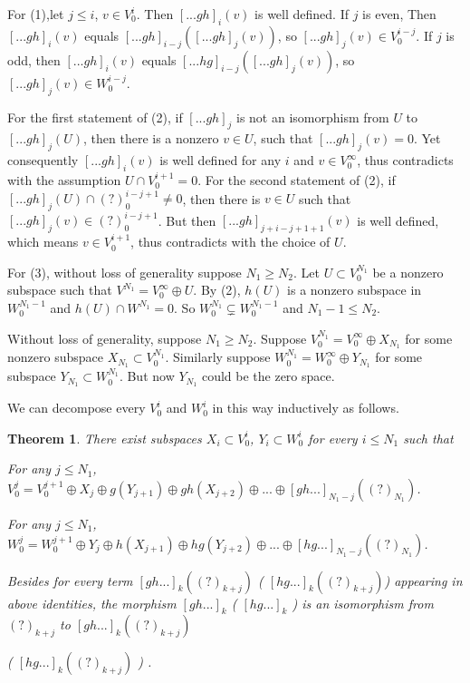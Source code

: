 \def\CTEXPreproc{Created by ctex v0.2.12, don't edit!}\documentclass[11pt]{article}
\newtheorem{thm}{Theorem}[section]
\begin{document}
\begin{pf} For (1),let $j\leq i$, $v\in V^i_0$. Then $[...gh]_i(v)$ is well defined. If $j$ is even, Then $[...gh]_i(v)$ equals
$[...gh]_{i-j}( [...gh]_{j}(v)  )$, so $ [...gh]_{j}(v)\in V^{i-j}_0   $. If $j$ is odd, then $ [...gh]_i(v) $ equals
$ [...hg]_{i-j}( [...gh]_{j}(v)  )  $, so $ [...gh]_{j}(v)\in W^{i-j}_0   $.

For the first statement of  (2), if $[...gh]_j$ is not an isomorphism from $U$ to $ [...gh]_j (U)$, then there is a nonzero $v\in U$, such that $[...gh]_j (v)=0   $. Yet consequently $[...gh]_i (v) $ is well defined for any $i$ and $v\in V^{\infty}_0$, thus contradicts with the assumption $U\cap V^{i+1}_0 =0$.
For the second statement of (2), if  $[...gh]_j (U)\cap (?)^{i-j+1} _0 \neq0  $, then there is $v\in U$ such that $[...gh]_j (v) \in (?)^{i-j+1} _0  $. But then $[...gh]_{j+i-j+1+1}(v)$ is well defined, which means $ v\in V^{i+1}_0  $, thus contradicts with the choice of $U$.

For (3), without loss of generality suppose $N_1 \geq N_2$. Let $U\subset V^{N_1}_0 $ be a nonzero subspace such that
$V^{N_1} = V^{\infty}_0 \oplus U $. By (2), $h(U )$ is a nonzero subspace in $ W^{N_1 -1 }_0 $ and $h(U)\cap W^{N_1 }=0   $. So
$W^{N_1}_0 \subsetneq W^{N_1 -1}_0 $ and $N_1 -1 \leq N_2  $. \\

\end{pf}

Without loss of generality, suppose $N_1 \geq N_2$. Suppose $V^{N_1}_0 = V^{\infty}_0 \oplus X_{N_1 }$ for some nonzero subspace
$X_{N_1}\subset V^{N_1}_0$.
 Similarly suppose $W^{N_1}_0 = W^{\infty}_0 \oplus Y_{N_1}$ for some subspace $Y_{N_1}\subset W^{N_1}_0$. But now $Y_{N_1}$ could be the zero space.

We can decompose every $V^i _0$ and $W^i_0$ in this way inductively as follows.

\begin{thm}  There exist subspaces $X_i \subset V^{i}_0$, $Y_i \subset W^i_0  $ for every $i\leq N_1$ such that

For any $j\leq N_1$,  $V^j_0 =  V^{j+1}_0 \oplus X_j \oplus g(Y_{j+1})\oplus gh(X_{j+2})\oplus...\oplus [gh...]_{N_1 -j}( (?)_{N_1} )$.

For any $j\leq N_1$,  $W^j_0 =  W^{j+1}_0 \oplus Y_j \oplus h(X_{j+1})\oplus hg(Y_{j+2})\oplus...\oplus [hg...]_{N_1 -j}( (?)_{N_1} )$.

Besides for every term $[gh...]_k ( (?)_{k+j}  )$ (  $[hg...]_k ( (?)_{k+j}  )$) appearing in above identities, the morphism $[gh...]_k$
( $[hg...]_k$  ) is an isomorphism from $(?)_{k+j}$ to  $[gh...]_k ( (?)_{k+j}  )$

\noindent(  $[hg...]_k ( (?)_{k+j}  )$   )  .

\end{thm}
\end{document}
